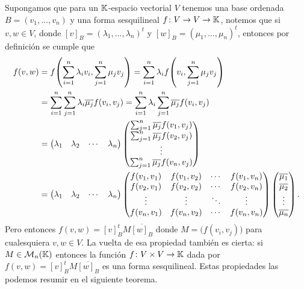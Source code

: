 Supongamos que para un $\mathbb{K}$-espacio vectorial $V$ tenemos una base ordenada $B = (v_1, \ldots, v_n)$ y una forma sesquilineal $f\colon V\to V \to\mathbb{K}$, notemos que si $v,w \in V$, donde $[v]_B = (\lambda_1, \ldots,\lambda_n)^t$ y $[w]_B = (\mu_1, \ldots,\mu_n)^t$, entonces por definición se cumple que
\begin{align*}
  f(v,w) &= f\paren{ \sum_{i=1}^n \lambda_i v_i, \sum_{j=1}^n \mu_j v_j } 
     = \sum_{i=1}^n \lambda_i  f\paren{ v_i, \sum_{j=1}^n \mu_j v_j } \\
    &= \sum_{i=1}^n  \sum_{j=1}^n  \lambda_i\overline{\mu_j} f\paren{ v_i, v_j } 
     = \sum_{i=1}^n \lambda_i \sum_{j=1}^n  \overline{\mu_j} f\paren{ v_i, v_j } \\
    &= \begin{pmatrix} \lambda_1 & \lambda_2 & \cdots & \lambda_n \end{pmatrix}
       \begin{pmatrix} \sum_{j=1}^n \overline{\mu_j} f(v_1,v_j) \\
        \sum_{j=1}^n \overline{\mu_j} f(v_2,v_j) \\
        \vdots \\
        \sum_{j=1}^n \overline{\mu_j} f(v_n,v_j) 
       \end{pmatrix} \\
    &= \begin{pmatrix} \lambda_1 & \lambda_2 & \cdots & \lambda_n \end{pmatrix}
       \begin{pmatrix}
        f(v_1, v_1)  & f(v_1, v_2) & \cdots & f(v_1, v_n) \\
        f(v_2, v_1)  & f(v_2, v_2) & \cdots & f(v_2, v_n) \\
        \vdots & \vdots & \ddots & \vdots \\
        f(v_n, v_1)  & f(v_n, v_2) & \cdots & f(v_n, v_n) \\
       \end{pmatrix}
      \begin{pmatrix} \overline{\mu_1} \\ \overline{\mu_2} \\ \vdots \\ \overline{\mu_n} \end{pmatrix}.
\end{align*}
Pero entonces $f(v,w) = [v]_B^t M \overline{[w]_B}$ donde $M = \bigl(f(v_i,v_j)\bigr)$ para cualesquiera $v,w \in V$. La vuelta de esa propiedad también es cierta: si $M \in \mathcal{M}_n(\mathbb{K})$ entonces la función $f\colon V\times V \to \mathbb{K}$ dada por $f(v,w) = [v]_B^t M \overline{[w]_B}$ es una forma sesquilineal. Estas propiedades las podemos resumir en el siguiente teorema.

